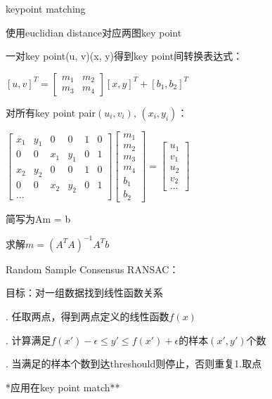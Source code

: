 \documentclass[UTF8]{ctexart}
\begin{document}
  \quad keypoint matching

  \quad \quad 使用euclidian distance对应两图key point

  \quad \quad 一对key point(u, v)(x, y)得到key point间转换表达式：

  \quad \quad \quad $[u, v]^T = 
    \begin{bmatrix}
      m_1 & m_2 \\
      m_3 & m_4
      \end{bmatrix}
    [x, y]^T + [b_1, b_2]^T$

  \quad \quad \quad 对所有key point pair$(u_i, v_i)$, $(x_i, y_i)$：

  \quad \quad \quad $
    \begin{bmatrix}
      x_1 & y_1 & 0 & 0 & 1 & 0 \\
      0 & 0 & x_1 & y_1 & 0 & 1 \\
      x_2 & y_2 & 0 & 0 & 1 & 0 \\
      0 & 0 & x_2 & y_2 & 0 & 1 \\
      ... 
      \end{bmatrix}
    \begin{bmatrix}
      m_1 \\
      m_2 \\
      m_3 \\ 
      m_4 \\
      b_1 \\
      b_2
      \end{bmatrix}
    =
    \begin{bmatrix}
      u_1 \\
      v_1 \\
      u_2 \\ 
      v_2 \\
      ...
      \end{bmatrix}$

  \quad \quad \quad 简写为Am = b

  \quad \quad \quad 求解$m = (A^TA)^{-1}A^Tb$

  Random Sample Consensus RANSAC：

  \quad 目标：对一组数据找到线性函数关系

  . 任取两点，得到两点定义的线性函数$f(x)$

  . 计算满足$f(x') - \epsilon \leq y' \leq f(x') + \epsilon$的样本$(x', y')$个数

  . 当满足的样本个数到达threshould则停止，否则重复1.取点

  \quad **应用在key point match**
  
\end{document}
